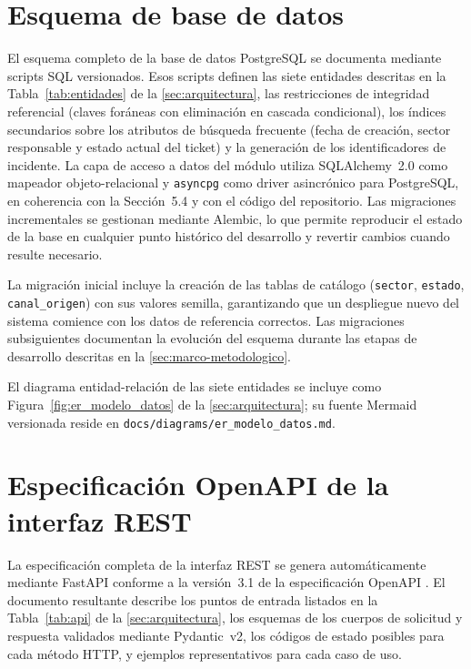 \section{Esquema de base de datos}\label{sec:anexo-esquema-bd}

El esquema completo de la base de datos PostgreSQL se documenta mediante scripts SQL versionados. Esos scripts definen las siete entidades descritas en la Tabla~\ref{tab:entidades} de la \autoref{sec:arquitectura}, las restricciones de integridad referencial (claves foráneas con eliminación en cascada condicional), los índices secundarios sobre los atributos de búsqueda frecuente (fecha de creación, sector responsable y estado actual del ticket) y la generación de los identificadores de incidente. La capa de acceso a datos del módulo utiliza SQLAlchemy~2.0 como mapeador objeto-relacional y \texttt{asyncpg} como driver asincrónico para PostgreSQL, en coherencia con la Sección~5.4 y con el código del repositorio. Las migraciones incrementales se gestionan mediante Alembic, lo que permite reproducir el estado de la base en cualquier punto histórico del desarrollo y revertir cambios cuando resulte necesario.

La migración inicial incluye la creación de las tablas de catálogo (\texttt{sector}, \texttt{estado}, \texttt{canal\_}\allowbreak\texttt{origen}) con sus valores semilla, garantizando que un despliegue nuevo del sistema comience con los datos de referencia correctos. Las migraciones subsiguientes documentan la evolución del esquema durante las etapas de desarrollo descritas en la \autoref{sec:marco-metodologico}.

El diagrama entidad-relación de las siete entidades se incluye como Figura~\ref{fig:er_modelo_datos} de la \autoref{sec:arquitectura}; su fuente Mermaid versionada reside en \texttt{docs/diagrams/er\_modelo\_datos.md}.

\section{Especificación OpenAPI de la interfaz REST}\label{sec:anexo-openapi}

La especificación completa de la interfaz REST se genera automáticamente mediante FastAPI conforme a la versión~3.1 de la especificación OpenAPI \parencite{Tiangolo2024_fastapi}. El documento resultante describe los puntos de entrada listados en la Tabla~\ref{tab:api} de la \autoref{sec:arquitectura}, los esquemas de los cuerpos de solicitud y respuesta validados mediante Pydantic~v2, los códigos de estado posibles para cada método HTTP, y ejemplos representativos para cada caso de uso.

